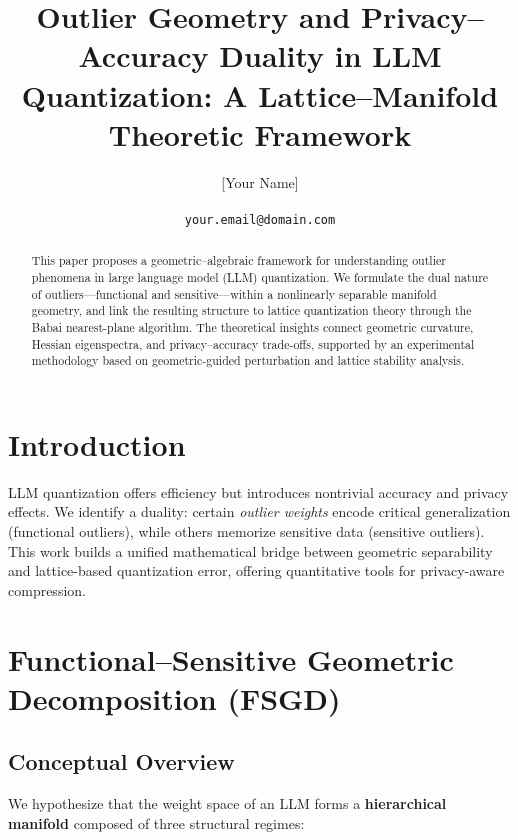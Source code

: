 \documentclass[letterpaper,twocolumn,10pt]{article}
\begin{document}
\title{\Large \bf Outlier Geometry and Privacy–Accuracy Duality in LLM Quantization: 
A Lattice–Manifold Theoretic Framework}

\author{
{\rm [Your Name]}\\
[Your University]\\
{\tt your.email@domain.com}
}

\maketitle

\begin{abstract}
This paper proposes a geometric–algebraic framework for understanding outlier phenomena in large language model (LLM) quantization. We formulate the dual nature of outliers—functional and sensitive—within a nonlinearly separable manifold geometry, and link the resulting structure to lattice quantization theory through the Babai nearest-plane algorithm. The theoretical insights connect geometric curvature, Hessian eigenspectra, and privacy–accuracy trade-offs, supported by an experimental methodology based on geometric-guided perturbation and lattice stability analysis.
\end{abstract}

\section{Introduction}
LLM quantization offers efficiency but introduces nontrivial accuracy and privacy effects. 
We identify a duality: certain \emph{outlier weights} encode critical generalization (functional outliers), while others memorize sensitive data (sensitive outliers). 
This work builds a unified mathematical bridge between geometric separability and lattice-based quantization error, offering quantitative tools for privacy-aware compression.

\section{Functional–Sensitive Geometric Decomposition (FSGD)}

\subsection{Conceptual Overview}
We hypothesize that the weight space of an LLM forms a \textbf{hierarchical manifold} 
composed of three structural regimes:
\end{document}
